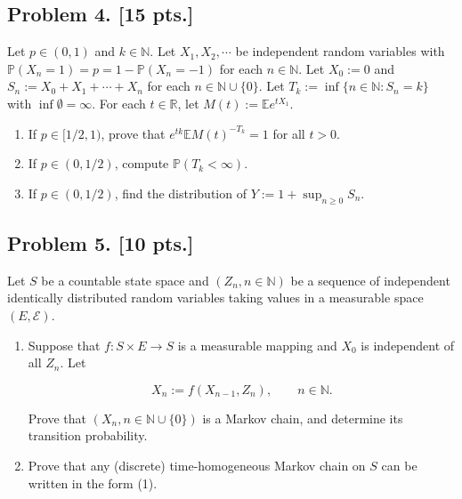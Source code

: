\documentclass[11pt,a4paper]{article}
\begin{document}
\subsection{Problem 4. [15 pts.]}
Let \( p \in (0, 1) \) and \( k \in \mathbb{N} \). Let \( X_1, X_2, \cdots \) be independent random variables with \( \mathbb{P}(X_n = 1) = p = 1 - \mathbb{P}(X_n = -1) \) for each \( n \in \mathbb{N} \). Let \( X_0 := 0 \) and \( S_n := X_0 + X_1 + \cdots + X_n \) for each \( n \in \mathbb{N} \cup \{0\} \). Let \( T_k := \inf\{n \in \mathbb{N} : S_n = k\} \) with \( \inf \emptyset = \infty \). For each \( t \in \mathbb{R} \), let \( M(t) := \mathbb{E} e^{t X_1} \).
\begin{enumerate}[label=(\alph*)]
    \item If \( p \in [1/2, 1) \), prove that \( e^{tk} \mathbb{E} M(t)^{-T_k} = 1 \) for all \( t > 0 \).
    \item If \( p \in (0, 1/2) \), compute \( \mathbb{P}(T_k < \infty) \).
    \item If \( p \in (0, 1/2) \), find the distribution of \( Y := 1 + \sup_{n \ge 0} S_n \).
\end{enumerate}

\subsection{Problem 5. [10 pts.]}
Let \( S \) be a countable state space and \( (Z_n, n \in \mathbb{N}) \) be a sequence of independent identically distributed random variables taking values in a measurable space \( (E, \mathcal{E}) \).
\begin{enumerate}[label=(\alph*)]
    \item Suppose that \( f : S \times E \to S \) is a measurable mapping and \( X_0 \) is independent of all \( Z_n \). Let

    \begin{equation}
    X_n := f(X_{n-1}, Z_n), \qquad n \in \mathbb{N}. \tag{1}
    \end{equation}

    Prove that \( (X_n, n \in \mathbb{N} \cup \{0\}) \) is a Markov chain, and determine its transition probability.
    \item Prove that any (discrete) time-homogeneous Markov chain on \( S \) can be written in the form (1).
\end{enumerate}

\setcounter{section}{5}
\setcounter{theorem}{0}
\setcounter{definition}{0}
\setcounter{remark}{0}
\setcounter{note}{0}
\end{document}
